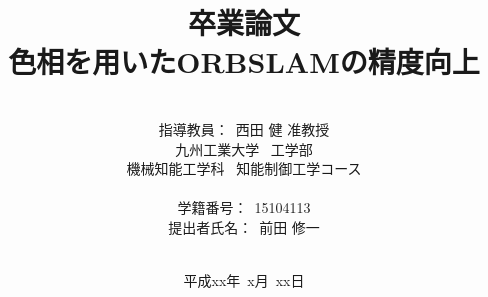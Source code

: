 
\title{卒業論文\\
色相を用いたORBSLAMの精度向上\\
}
\author{\\
指導教員：\ 西田 \hspace{0mm} 健 准教授\\
九州工業大学\ \hspace{0mm} 工学部\\
機械知能工学科\ \hspace{0mm} 知能制御工学コース \\
\vspace{0mm}\\
学籍番号：\ 15104113\\
提出者氏名：\ 前田 \hspace{0mm} 修一\\\vspace{5mm}\\ }
\date{平成xx年\ x月\ xx日}


